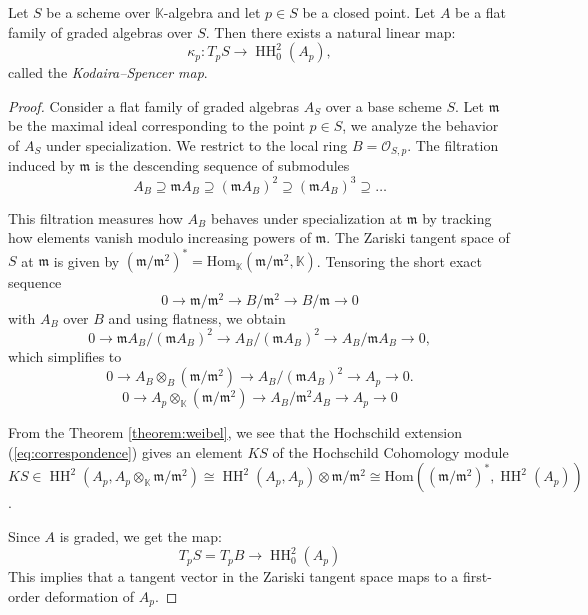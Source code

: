 \documentclass{amsart}
\def\HH{\operatorname{HH}}
\begin{document}
\begin{theorem}\label{thm:KodairaSpencer} Let $S$ be a scheme over  $\mathbb{K}$-algebra and let \( p \in S \) be a closed point.  Let $A$ be a flat family of graded algebras over $S.$  Then there exists a natural linear map:
\[
\kappa_p : T_p  S \to \HH^2_0(A_p),
\]
called the \emph{Kodaira–Spencer map}.
\end{theorem}
\begin{proof}
\noindent Consider a flat family of graded algebras $A_S$ over a base scheme $S$. 
Let $\mathfrak{m}$ be the maximal ideal corresponding to the point \(p \in S \), we analyze the behavior of $A_S$ under specialization. We restrict to the local ring $B=\mathcal{O}_{S,p}$.
The filtration induced by \( \mathfrak{m} \) is the descending sequence of submodules
\[
A_B \supseteq \mathfrak{m}A_B \supseteq (\mathfrak{m}A_B)^2 \supseteq (\mathfrak{m}A_B)^3 \supseteq \dots
\]

 This filtration measures how \( A_B \) behaves under specialization at \( \mathfrak{m} \) by tracking how elements vanish modulo increasing powers of \( \mathfrak{m} \). 
\noindent The Zariski tangent space of $S$ at $\mathfrak{m}$ is given by $(\mathfrak{m}/\mathfrak{m}^2)^* = \text{Hom}_\mathbb{K}(\mathfrak{m}/\mathfrak{m}^2, \mathbb{K})$. Tensoring the short exact sequence
\[
    0 \to \mathfrak{m}/\mathfrak{m}^2 \to B/\mathfrak{m}^2 \to B/\mathfrak{m} \to 0
\]
with $A_B$ over $B$ and using flatness, we obtain
\[
0 \to \mathfrak{m}A_B / (\mathfrak{m}A_B)^2 \to A_B / (\mathfrak{m}A_B)^2 \to A_B / \mathfrak{m}A_B \to 0,
\]
which simplifies to 
\[
    0 \to A_B \otimes_B (\mathfrak{m}/\mathfrak{m}^2) \to A_B / (\mathfrak{m}A_B)^2 \to A_p \to 0.
\]
\begin{equation} \label{eq:correspondence}
0 \to A_p \otimes_\mathbb{K} (\mathfrak{m}/\mathfrak{m}^2) \to A_B/\mathfrak{m}^2A_B \to A_p \to 0
\end{equation}

From the Theorem \ref{theorem:weibel}, we see that the Hochschild extension (\ref{eq:correspondence}) gives an element $KS$ of the Hochschild Cohomology module $KS \in \HH^2(A_p, A_p \otimes_\mathbb{K} \mathfrak{m}/\mathfrak{m}^2) \cong \HH^2(A_p, A_p) \otimes \mathfrak{m}/\mathfrak{m}^2 \cong \mathrm{Hom}((\mathfrak{m}/\mathfrak{m}^2)^*, \HH^2(A_p))$.

Since $A$ is graded, we get the map:
$$T_pS = T_pB \to \HH^2_0(A_p)$$
This implies that a tangent vector in the Zariski tangent space maps to a first-order deformation of $ A_p .$
\end{proof}
\end{document}

